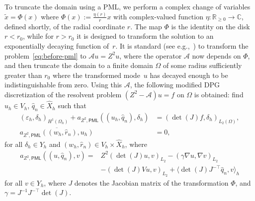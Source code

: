 \documentclass[12pt, oneside, reqno]{amsart}
\theoremstyle{remark}
\newcommand{\tForAll}{\text{ for all }}
\renewcommand{\hat}{\widehat}
\newcommand{\om}{\Omega}
\begin{document}
To truncate the domain using a PML, we perform a complex change of
variables \(\tilde{x} = \Phi(x)\) where
\(\Phi(x) := \frac{\eta(r)}{r} x\) with complex-valued function
\(\eta: \mathbb{R}_{\geq 0} \to \mathbb{C}\), defined shortly, of the
radial coordinate $r$.  The map $\Phi$ is the identity on the disk
$r < r_0$, while for $r>r_0$ it is designed to transform the solution
to an exponentially decaying function of~$r$.
It is standard (see e.g.,~\cite{ColMon1998-1}) to transform the
problem~\eqref{eq:before-pml} to \(\mathcal{A} u = Z^2 u\), where the
operator $\mathcal{A}$ now depends on $\Phi$, and then truncate the domain to
a finite domain $\om$ of some radius sufficiently greater than $r_0$
where  the transformed mode~$u$ has decayed enough to be indistinguishable from zero.
Using this
$\mathcal A$, the following modified DPG discretization of the
resolvent problem \((Z^2 - \mathcal{A}) u = f\) on $\Omega$ is obtained:
find \(u_h \in V_h\), \(\hat{q}_n \in \hat{X}_h\) such that
\begin{align}
  (\varepsilon_h, \delta_h)_{H^1(\Omega_h)} +
  a_{Z^2,\mathsf{PML}}((u_h, \hat{q}_n), \delta_h) &
  = (\det(J) f, \delta_h)_{L_2(\Omega)}, \\
  \overline{a_{Z^2,\mathsf{PML}}((w_h, \hat{r}_n), u_h)} &
  = 0,%
\end{align}
for all \(\delta_h \in Y_h\) and \((w_h, \hat{r}_n) \in V_h \times \hat{X}_h\),
where
\begin{equation}\label{eq:a-z2-pml}
  \begin{aligned}
    a_{Z^2,\mathsf{PML}}((u, \hat{q}_n), v) 
    =
    & Z^2(\det(J) u, v)_{L_2}
      - (\gamma \nabla u, \nabla v)_{L_2}
    \\
    & - (\det(J) V u, v)_{L_2}
      + \langle \det(J) J^{-\top} \hat{q}_n, v \rangle_h    
  \end{aligned}
\end{equation}
for all \(v \in Y_h\),
where \(J\) denotes the Jacobian matrix of the transformation \(\Phi\), and
\(\gamma = J^{-1} J^{-\top} \det(J)\).
\end{document}
